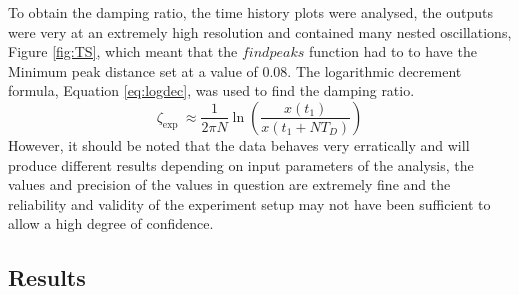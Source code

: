 \documentclass[11pt]{article}
\begin{document}
To obtain the damping ratio, the time history plots were analysed, the outputs were very at an extremely high resolution and contained many nested oscillations, Figure \ref{fig:TS}, which meant that the $findpeaks$ function had to to have the Minimum peak distance set at a value of 0.08. The logarithmic decrement formula, Equation \ref{eq:logdec}, was used to find the damping ratio.
\begin{equation}
    \zeta_{\text {exp }} \approx \frac{1}{2 \pi N} \ln \left(\frac{x\left(t_{1}\right)}{x\left(t_{1}+N T_{D}\right)}\right) \label{eq:logdec}
\end{equation}{}
However, it should be noted that the data behaves very erratically and will produce different results depending on input parameters of the analysis, the values and precision of the values in question are extremely fine and the reliability and validity of the experiment setup may not have been sufficient to allow a high degree of confidence. 

\subsection{Results}
\end{document}
